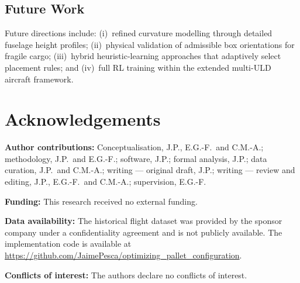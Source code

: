 \documentclass[12pt,a4paper]{article}
\begin{document}
\subsection{Future Work}
\label{sec:future}

Future directions include: (i)~refined curvature modelling through
detailed fuselage height profiles; (ii)~physical validation of
admissible box orientations for fragile cargo; (iii)~hybrid
heuristic-learning approaches that adaptively select placement rules;
and (iv)~full RL training within the extended multi-ULD aircraft
framework.


\section*{Acknowledgements}

\textbf{Author contributions:}
Conceptualisation, J.P., E.G.-F.\ and C.M.-A.;
methodology, J.P.\ and E.G.-F.;
software, J.P.;
formal analysis, J.P.;
data curation, J.P.\ and C.M.-A.;
writing --- original draft, J.P.;
writing --- review and editing, J.P., E.G.-F.\ and C.M.-A.;
supervision, E.G.-F.

\textbf{Funding:} This research received no external funding.

\textbf{Data availability:}
The historical flight dataset was provided by the sponsor company
under a confidentiality agreement and is not publicly available.
The implementation code is available at
\url{https://github.com/JaimePesca/optimizing_pallet_configuration}.

\textbf{Conflicts of interest:} The authors declare no conflicts of
interest.
\end{document}
